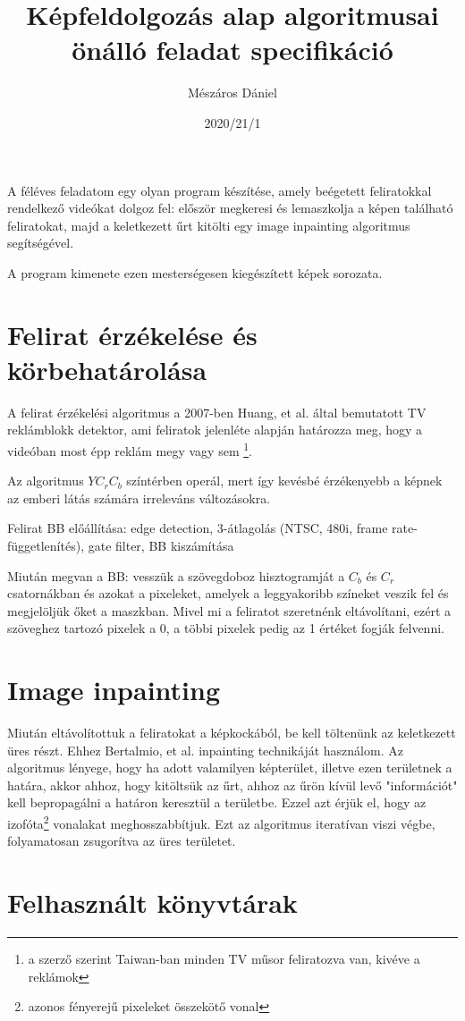 \documentclass[10pt, draft]{article}
\begin{document}
\title{Képfeldolgozás alap algoritmusai önálló feladat specifikáció}
\author{Mészáros Dániel}
\date{2020/21/1}
\maketitle

A féléves feladatom egy olyan program készítése, amely beégetett feliratokkal
rendelkező videókat dolgoz fel: először megkeresi és lemaszkolja a képen
található feliratokat, majd a keletkezett űrt kitölti egy image inpainting
algoritmus segítségével.

A program kimenete ezen mesterségesen kiegészített képek sorozata.

\section{Felirat érzékelése és körbehatárolása}
A felirat érzékelési algoritmus a 2007-ben Huang, et al.
\cite{huang2007intelligent} által bemutatott TV reklámblokk detektor, ami
feliratok jelenléte alapján határozza meg, hogy a videóban most épp reklám megy
vagy sem \footnote{a szerző szerint Taiwan-ban minden TV műsor feliratozva van,
kivéve a reklámok}.

Az algoritmus $Y C_r C_b$ színtérben operál, mert így kevésbé érzékenyebb a
képnek az emberi látás számára irreleváns változásokra.

Felirat BB előállítása: edge detection, 3-átlagolás (NTSC, 480i, frame
rate-függetlenítés), gate filter, BB kiszámítása

Miután megvan a BB: vesszük a szövegdoboz hisztogramját a $C_b$ és $C_r$
csatornákban és azokat a pixeleket, amelyek a leggyakoribb színeket veszik fel
és megjelöljük őket a maszkban.
Mivel mi a feliratot szeretnénk eltávolítani, ezért a szöveghez tartozó
pixelek a 0, a többi pixelek pedig az 1 értéket fogják felvenni.
\cite{huang2007intelligent}

\section{Image inpainting}

Miután eltávolítottuk a feliratokat a képkockából, be kell töltenünk az
keletkezett üres részt.
Ehhez Bertalmio, et al. \cite{bertalmio2000image} inpainting technikáját
használom.
Az algoritmus lényege, hogy ha adott valamilyen képterület, illetve ezen
területnek a határa, akkor ahhoz, hogy kitöltsük az űrt, ahhoz az űrön kívül
levő "információt" kell bepropagálni a határon keresztül a területbe.
Ezzel azt érjük el, hogy az izofóta\footnote{azonos fényerejű pixeleket
összekötő vonal} vonalakat meghosszabbítjuk.
Ezt az algoritmus iteratívan viszi végbe, folyamatosan zsugorítva az üres
területet.


\section{Felhasznált könyvtárak}

\printbibliography
\end{document}
